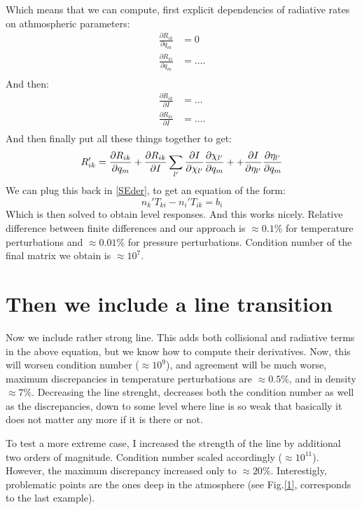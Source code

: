 \documentclass[a4paper,10pt]{article}
\begin{document}
Which means that we can compute, first explicit dependencies of radiative rates on athmospheric parameters:
\begin{align}
 \frac{\partial R_{ik}}{\partial q_m} & = 0 \\
 \frac{\partial R_{ki}}{\partial q_m} & = .... \\
\end{align}
And then:
\begin{align}
 \frac{\partial R_{ik}}{\partial I} & = ... \\
 \frac{\partial R_{ki}}{\partial I} & = .... \\
\end{align}
And then finally put all these things together to get:
\begin{equation}
 R_{ik}' = \frac{\partial R_{ik}}{\partial q_m} + \frac{\partial R_{ik}}{\partial I} \sum_{l'} \frac{\partial I}{\partial \chi_{l'}} \frac{\partial \chi_{l'}}{\partial q_m} + 
 + \frac{\partial I}{\partial \eta_{l'}} \frac{\partial \eta_{l'}}{\partial q_m} \\
\end{equation}
We can plug this back in \ref{SEder}, to get an equation of the form:
\begin{equation}
 n_k' T_{ki} - n_i' T_{ik} =  b_i
\end{equation}
Which is then solved to obtain level responses. And this works nicely. Relative difference between finite differences and our approach is $\approx 0.1 \%$ for temperature perturbations and $\approx 0.01\%$ for pressure perturbations. Condition number of the final matrix we obtain is $\approx 10^7$.

\section{Then we include a line transition}

Now we include rather strong line. This adds both collisional and radiative terms in the above equation, but we know how to compute their derivatives. Now, this will worsen condition number ($\approx 10^9$), and agreement will be much worse, maximum discrepancies in temperature perturbations are $\approx 0.5\%$, and in density $\approx 7\%$. Decreasing the line strenght, decreases both the condition number as well as the discrepancies, down to some level where line is so weak that basically it does not matter any more if it is there or not. 

To test a more extreme case, I increased the strength of the line by additional two orders of magnitude. Condition number scaled accordingly ($\approx 10^{11}$). However, the maximum discrepancy increased only to $\approx 20\%$. Interestigly, problematic points are the ones deep in the atmosphere (see Fig.\ref{1}, corresponds to the last example).
\end{document}
